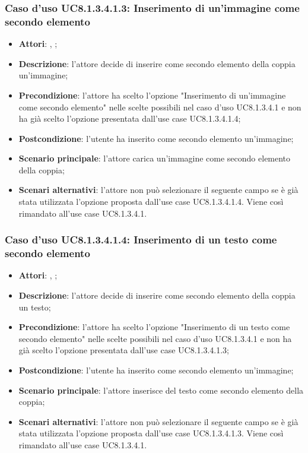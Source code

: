 			\subsubsection{Caso d'uso UC8.1.3.4.1.3: Inserimento di un'immagine come secondo elemento}
		\label{UC8.1.3.4.1.3}
		\begin{itemize}
			\item \textbf{Attori}: \uau, \uaupro;
			\item \textbf{Descrizione}: l'attore decide di inserire come secondo elemento della coppia un'immagine;
			\item \textbf{Precondizione}: l'attore ha scelto l'opzione "Inserimento di un'immagine come secondo elemento" nelle scelte possibili nel caso d'uso UC8.1.3.4.1 e non ha già scelto l'opzione presentata dall'use case UC8.1.3.4.1.4;
			\item \textbf{Postcondizione}: l'utente ha inserito come secondo elemento un'immagine;
			\item \textbf{Scenario principale}: l'attore carica un'immagine come secondo elemento della coppia;  
			\item \textbf{Scenari alternativi}: l'attore non può selezionare il seguente campo se è già stata utilizzata l'opzione proposta dall'use case UC8.1.3.4.1.4. Viene così rimandato all'use case UC8.1.3.4.1.
		\end{itemize}
		
		\subsubsection{Caso d'uso UC8.1.3.4.1.4: Inserimento di un testo come secondo elemento}
		\label{UC8.1.3.4.1.4}
		\begin{itemize}
			\item \textbf{Attori}: \uau, \uaupro;
			\item \textbf{Descrizione}: l'attore decide di inserire come secondo elemento della coppia un testo;
			\item \textbf{Precondizione}: l'attore ha scelto l'opzione "Inserimento di un testo come secondo elemento" nelle scelte possibili nel caso d'uso UC8.1.3.4.1 e non ha già scelto l'opzione presentata dall'use case UC8.1.3.4.1.3;
			\item \textbf{Postcondizione}: l'utente ha inserito come secondo elemento un'immagine;
			\item \textbf{Scenario principale}: l'attore inserisce del testo come secondo elemento della coppia;  
			\item \textbf{Scenari alternativi}: l'attore non può selezionare il seguente campo se è già stata utilizzata l'opzione proposta dall'use case UC8.1.3.4.1.3. Viene così rimandato all'use case UC8.1.3.4.1.
		\end{itemize}
	
